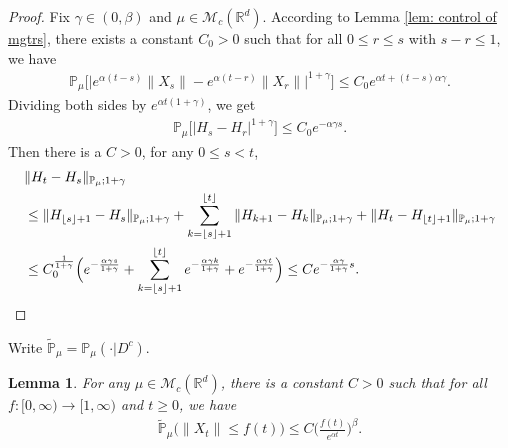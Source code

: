 \documentclass[12pt]{amsart}
\theoremstyle{plain}
\newtheorem{lem}[thm]{Lemma}
\theoremstyle{definition}
\numberwithin{equation}{section}
\begin{document}
\begin{proof}
     Fix $\gamma \in (0,\beta)$ and $\mu\in \mathcal M_c(\mathbb R^d)$.
 According to Lemma \ref{lem: control of mgtrs}, there exists a constant $C_0>0$ such that for all $0\leq r\leq s $ with $s-r\leq1$, we have
    \begin{align}
        \mathbb{P}_{\mu}\big[\big|e^{\alpha(t-s)}\|X_s\|-e^{\alpha(t-r)}\|X_r\|\big|^{1+\gamma}\big]
        \leq C_0e^{\alpha t+(t-s)\alpha\gamma}.
    \end{align}
    Dividing both sides by $e^{\alpha t(1+\gamma)}$, we get
    \begin{align}
        \mathbb{P}_{\mu}\big[|H_s-H_r|^{1+\gamma}\big]\leq  C_0 e^{-\alpha \gamma s}.
    \end{align}
    Then there is a $C>0$, for any $0\leq s<t$,
\begin{align}
	& \|H_t-H_s\|_{\mathbb{P}_{\mu};1+\gamma}
	\\&\leq \|H_{\lfloor s \rfloor+1}-H_s\|_{\mathbb{P}_{\mu};1+\gamma}+\sum_{k=\lfloor s \rfloor+1}^{\lfloor t \rfloor}\|H_{k+1}-H_{k}\|_{\mathbb{P}_{\mu};1+\gamma}+\|H_t-H_{\lfloor t \rfloor+1}\|_{\mathbb{P}_{\mu};1+\gamma}
	\\& \leq C_0^{\frac{1}{1+\gamma}} \Big(e^{-\frac{\alpha \gamma s}{1+\gamma}}+\sum_{k=\lfloor s \rfloor+1}^{\lfloor t \rfloor}e^{-\frac{\alpha \gamma k}{1+\gamma}}+ e^{-\frac{\alpha \gamma t}{1+\gamma}}\Big)
	\leq Ce^{-\frac{\alpha \gamma}{1+\gamma}s}.
    \qedhere
\end{align}	
\end{proof}

Write $\mathbb{\tilde{P}}_{\mu}=\mathbb{P}_{\mu}(\cdot|D^c)$.
\begin{lem}
\label{lem: control of XT}
	For any $\mu\in \mathcal M_c(\mathbb R^d)$, there is a constant $C>0$ such that for all $f:[0,\infty)\to [1,\infty)$ and $t\geq 0$, we have
\begin{align}
    \mathbb{\tilde{P}}_{\mu}\big(\|X_t\|\leq f(t)\big)\leq C \Big(\frac{f(t)}{e^{\alpha t}}\Big)^{\beta}.
\end{align}
\end{lem}
\end{document}
